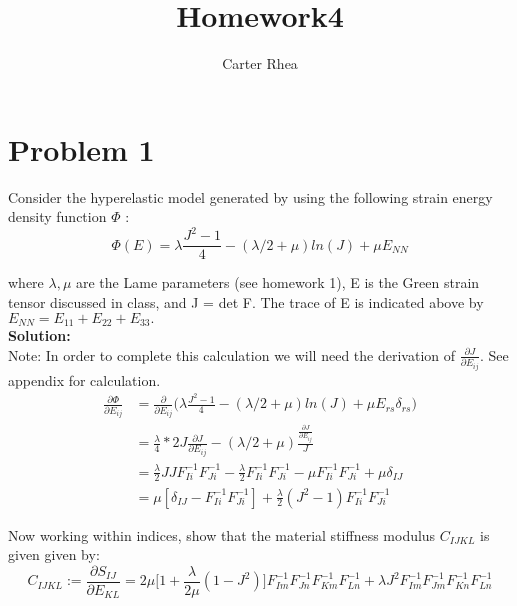 \documentclass[10pt,a4paper]{article}
\author{Carter Rhea}
\title{Homework4}
\begin{document}
	\maketitle
	
	\section{Problem 1}
	Consider the hyperelastic model generated by using the following strain energy density function $\Phi$ :
	$$ \Phi(E) = \lambda \frac{J^2 -1}{4} - (\lambda/2 + \mu)ln(J)+\mu E_{NN} $$

where $\lambda , \mu$ are the Lame parameters (see homework 1), E is the Green strain tensor discussed in class, and J = det F. The trace of E is indicated above by $E_{NN} =E_{11}+E_{22}+E_{33}.$\\
   \textbf{Solution:}\\
   Note: In order to complete this calculation we will need the derivation of $\frac{\partial J}{\partial E_{ij}}$. See appendix for calculation.\\
  
  \begin{equation}
  	\begin{split}
	  \frac{\partial \Phi}{\partial E_{ij}} &= \frac{\partial}{\partial E_{ij}}\Big(\lambda \frac{J^2 -1}{4} - (\lambda/2 + \mu)ln(J)+\mu E_{rs}\delta_{rs}  \Big) \\ 
	    &= \frac{\lambda}{4}*2J\frac{\partial J}{\partial E_{ij}}- (\lambda/2 + \mu)\frac{\frac{\partial J}{\partial{E_{ij}}}}{J}\\
	    &=\frac{\lambda}{2}JJF^{-1}_{Ii}F^{-1}_{Ji}-\frac{\lambda}{2}F^{-1}_{Ii}F^{-1}_{Ji}-\mu F^{-1}_{Ii}F^{-1}_{Ji} + \mu \delta_{IJ}\\
	    &=\mu[\delta_{IJ}-F^{-1}_{Ii}F^{-1}_{Ji}] + \frac{\lambda}{2}(J^2-1)F^{-1}_{Ii}F^{-1}_{Ji}
	\end{split}
  \end{equation}
   
   Now working within indices, show that the material stiffness modulus $C_{IJKL}$ is given given by:
   $$C_{IJKL}:=\frac{\partial S_{IJ}}{\partial E_{KL}} = 2\mu \Big[ 1 + \frac{\lambda}{2\mu}(1-J^2)\Big]F^{-1}_{Im}F^{-1}_{Jn}F^{-1}_{Km}F^{-1}_{Ln}+\lambda J^2 F^{-1}_{Im}F^{-1}_{Jm}F^{-1}_{Kn}F^{-1}_{Ln} $$ 
   
\end{document}
